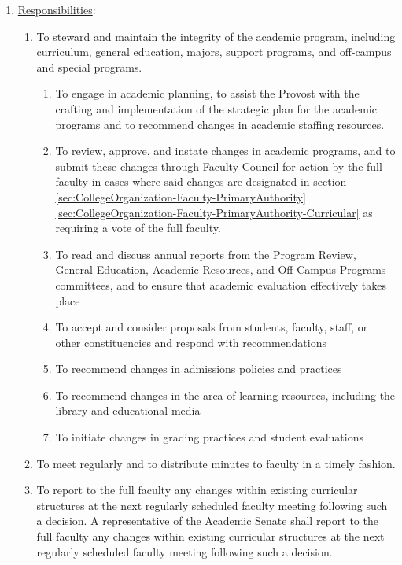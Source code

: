 \begin{enumerate}[label=\alph*)]
{\begin{enumerate}[label=\arabic*)]
							\end{enumerate}
						}
						\item{\underline{Responsibilities}:
							\begin{enumerate}[label=\arabic*)]
								\item{To steward and maintain the integrity of the academic program, including curriculum, general education, majors, support programs, and off-campus and special programs.
									\begin{enumerate}[label=(\alph*)]
										\item{To engage in academic planning, to assist the Provost with the crafting and implementation of the strategic plan for the academic programs and to recommend changes in academic staffing resources.}
										\item{To review, approve, and instate changes in academic programs, and to submit these changes through Faculty Council for action by the full faculty in cases where said changes are designated in
											section
											\ref{sec:CollegeOrganization-Faculty-PrimaryAuthority}
											\ref{sec:CollegeOrganization-Faculty-PrimaryAuthority-Curricular}
											as requiring a vote of the full faculty.}
										\item{To read and discuss annual reports from the Program Review, General Education, Academic Resources, and Off-Campus Programs committees, and to ensure that academic evaluation effectively takes place}
										\item{To accept and consider proposals from students, faculty, staff, or other constituencies and respond with recommendations}
										\item{To recommend changes in admissions policies and practices}
										\item{To recommend changes in the area of learning resources, including the library and educational media}
										\item{To initiate changes in grading practices and student evaluations}
									\end{enumerate}
								}
								\item{To meet regularly and to distribute minutes to faculty in a timely fashion.}
								\item{To report to the full faculty any changes within existing curricular structures at the next regularly scheduled faculty meeting following such a decision. A representative of the Academic Senate shall report to the full faculty any changes within existing curricular structures at the next regularly scheduled faculty meeting following such a decision.}

\end{enumerate}}
\end{enumerate}
